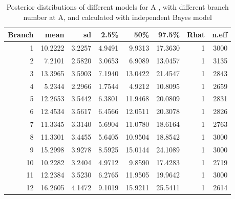\begin{table}[!t]
	\centering
	\begin{tabular}{rrrrrrrr}
		\hline
		Branch & mean & sd & 2.5\% & 50\% & 97.5\% & Rhat & n.eff \\ 
		\hline
		1 & 10.2222 & 3.2257 & 4.9491 & 9.9313 & 17.3630 & 1 & 3000 \\ 
		2 & 7.2101 & 2.5820 & 3.0653 & 6.9089 & 13.0457 & 1& 3135 \\ 
		3 & 13.3965 & 3.5903 & 7.1940 & 13.0422 & 21.4547 & 1 & 2843 \\ 
		4 & 5.2344 & 2.2966 & 1.7544 & 4.9212 & 10.8095 & 1 & 2659 \\ 
		5 & 12.2653 & 3.5442 & 6.3801 & 11.9468 & 20.0809 & 1 & 2831 \\ 
		6 & 12.4534 & 3.5617 & 6.4566 & 12.0511 & 20.3078 & 1 & 2826 \\ 
		7 & 11.3345 & 3.3140 & 5.6904 & 11.0780 & 18.6164 & 1 & 2763 \\ 
		8 & 11.3301 & 3.4455 & 5.6405 & 10.9504 & 18.8542 & 1 & 3000 \\ 
		9 & 15.2998 & 3.9278 & 8.5925 & 15.0144 & 24.1089 & 1 & 3000\\ 
		10 & 10.2282 & 3.2404 & 4.9712 & 9.8590 & 17.4283 & 1 & 2719 \\ 
		11 & 12.2384 & 3.5230 & 6.2765 & 11.9505 & 19.9642 & 1 & 3000 \\ 
		12 & 16.2605 & 4.1472 & 9.1019 & 15.9211 & 25.5411 & 1 & 2614 \\ 
		\hline
	\end{tabular}
	\caption{Posterior distributions of different models for A , with different branch number at A, and calculated with independent Bayes model} 
	\label{tab:pstproA}
\end{table}

